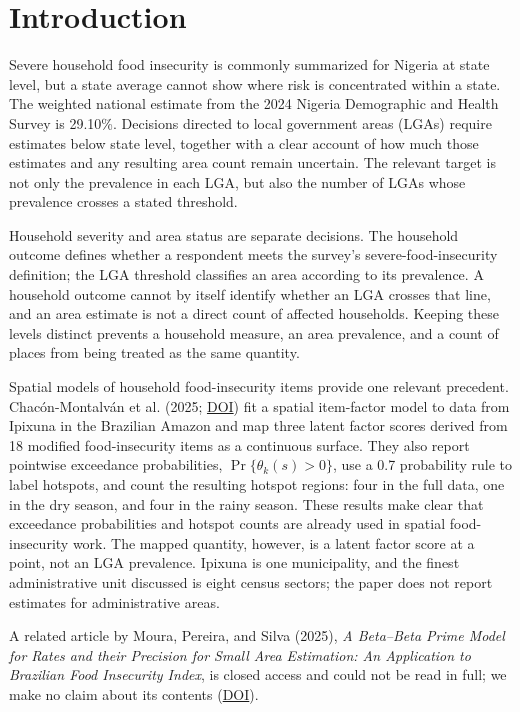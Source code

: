 \section{Introduction}

Severe household food insecurity is commonly summarized for Nigeria at state level, but a state average cannot show where risk is concentrated within a state. The weighted national estimate from the 2024 Nigeria Demographic and Health Survey is 29.10\%. Decisions directed to local government areas (LGAs) require estimates below state level, together with a clear account of how much those estimates and any resulting area count remain uncertain. The relevant target is not only the prevalence in each LGA, but also the number of LGAs whose prevalence crosses a stated threshold.

Household severity and area status are separate decisions. The household outcome defines whether a respondent meets the survey's severe-food-insecurity definition; the LGA threshold classifies an area according to its prevalence. A household outcome cannot by itself identify whether an LGA crosses that line, and an area estimate is not a direct count of affected households. Keeping these levels distinct prevents a household measure, an area prevalence, and a count of places from being treated as the same quantity.

Spatial models of household food-insecurity items provide one relevant precedent. Chacón-Montalván et al. (2025; \href{https://doi.org/10.1214/25-aoas2072}{DOI}) fit a spatial item-factor model to data from Ipixuna in the Brazilian Amazon and map three latent factor scores derived from 18 modified food-insecurity items as a continuous surface. They also report pointwise exceedance probabilities, \(\Pr\{\theta_k(s)>0\}\), use a 0.7 probability rule to label hotspots, and count the resulting hotspot regions: four in the full data, one in the dry season, and four in the rainy season. These results make clear that exceedance probabilities and hotspot counts are already used in spatial food-insecurity work. The mapped quantity, however, is a latent factor score at a point, not an LGA prevalence. Ipixuna is one municipality, and the finest administrative unit discussed is eight census sectors; the paper does not report estimates for administrative areas.

A related article by Moura, Pereira, and Silva (2025), \emph{A Beta--Beta Prime Model for Rates and their Precision for Small Area Estimation: An Application to Brazilian Food Insecurity Index}, is closed access and could not be read in full; we make no claim about its contents (\href{https://doi.org/10.1093/jssam/smaf002}{DOI}).

